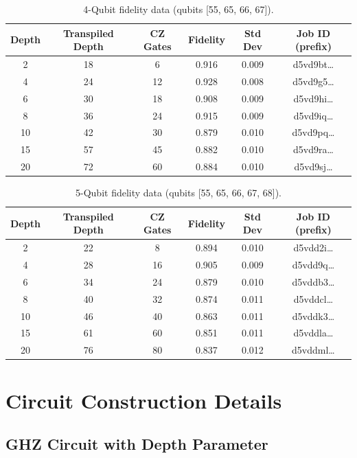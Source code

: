 \documentclass[12pt,letterpaper]{article}
\begin{document}
\begin{table}[ht]
\centering
\caption{4-Qubit fidelity data (qubits [55, 65, 66, 67]).}
\label{tab:4q}
\begin{tabular}{cccccc}
\toprule
Depth & Transpiled Depth & CZ Gates & Fidelity & Std Dev & Job ID (prefix) \\
\midrule
2  & 18 & 6  & 0.916 & 0.009 & d5vd9bt\ldots \\
4  & 24 & 12 & 0.928 & 0.008 & d5vd9g5\ldots \\
6  & 30 & 18 & 0.908 & 0.009 & d5vd9hi\ldots \\
8  & 36 & 24 & 0.915 & 0.009 & d5vd9iq\ldots \\
10 & 42 & 30 & 0.879 & 0.010 & d5vd9pq\ldots \\
15 & 57 & 45 & 0.882 & 0.010 & d5vd9ra\ldots \\
20 & 72 & 60 & 0.884 & 0.010 & d5vd9sj\ldots \\
\bottomrule
\end{tabular}
\end{table}

\begin{table}[ht]
\centering
\caption{5-Qubit fidelity data (qubits [55, 65, 66, 67, 68]).}
\label{tab:5q}
\begin{tabular}{cccccc}
\toprule
Depth & Transpiled Depth & CZ Gates & Fidelity & Std Dev & Job ID (prefix) \\
\midrule
2  & 22 & 8  & 0.894 & 0.010 & d5vdd2i\ldots \\
4  & 28 & 16 & 0.905 & 0.009 & d5vdd9q\ldots \\
6  & 34 & 24 & 0.879 & 0.010 & d5vddb3\ldots \\
8  & 40 & 32 & 0.874 & 0.011 & d5vddcl\ldots \\
10 & 46 & 40 & 0.863 & 0.011 & d5vddk3\ldots \\
15 & 61 & 60 & 0.851 & 0.011 & d5vddla\ldots \\
20 & 76 & 80 & 0.837 & 0.012 & d5vddml\ldots \\
\bottomrule
\end{tabular}
\end{table}

\section{Circuit Construction Details}

\subsection{GHZ Circuit with Depth Parameter}
\end{document}
